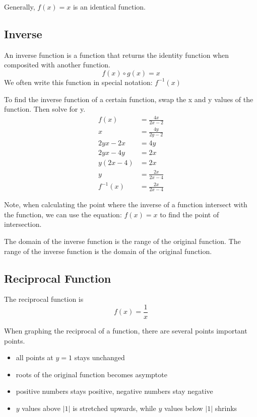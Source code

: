 \documentclass[../notes.tex]{subfiles}
\begin{document}
Generally, $f(x) = x$ is an identical function.

\subsection{Inverse}
An inverse function is a function that returns the identity function when composited with another function.
\begin{equation}
	f(x) \circ g(x) = x
\end{equation}
We often write this function in special notation: $f^{-1}(x)$

To find the inverse function of a certain function, swap the x and y values of the function.
Then solve for y.
\begin{align*}
	f(x)    & = \frac{4x}{2x-2} \\
	x       & = \frac{4y}{2y-2} \\
	2yx -2x & = 4y \\
	2yx-4y  & = 2x \\
	y(2x-4) & = 2x \\
	y       & = \frac{2x}{2x-4} \\
	f^{-1}(x) & = \frac{2x}{2x-4}
\end{align*} 

Note, when calculating the point where the inverse of a function intersect with the function, we can use the equation: $f(x) = x$ to find the point of intersection.

The domain of the inverse function is the range of the original function. 
The range of the inverse function is the domain of the original function.

\subsection{Reciprocal Function}
The reciprocal function is 
\begin{equation}
	f(x)=\frac{1}{x}
\end{equation}

When graphing the reciprocal of a function, there are several points important points.
\begin{itemize}
	\item all points at $y=1$ stays unchanged
	\item roots of the original function becomes asymptote
	\item positive numbers stays positive, negative numbers stay negative
	\item $y$ values above $|1|$ is stretched upwards, while $y$ values below $|1|$ shrinks
\end{itemize}
\end{document}
